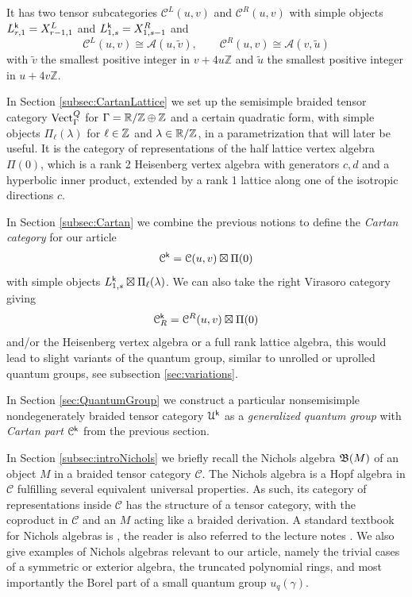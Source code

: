 \documentclass[a4paper, reqno]{amsart}
\theoremstyle{introTheorems}
\def\ZZ{\mathbb{Z}}
\newcommand\cA{\mathcal{A}}
\newcommand\cC{\mathcal{C}}
\newcommand\cU{\mathcal{U}}
\newcommand{\Vect}{\textup{Vect}}
\newcommand\g\gamma
\renewcommand{\1}{\mathbbold{1}}
\begin{document}
It has two tensor subcategories $\cC^L(u,v)$ and $\cC^R(u,v)$ with simple objects $L^{\mathsf{k}}_{r,1}=X^L_{r-1,1}$ and $L^{\mathsf{k}}_{1,s}=X^R_{1,s-1}$ and %
\[
\cC^L(u, v) \cong \cA(u, \tilde v), \qquad \cC^R(u, v) \cong \cA(v, \tilde u)
\]
with $\tilde v$ the smallest positive integer in $v + 4u \ZZ$ and $\tilde u $ the smallest positive integer in $u + 4v \ZZ$. 

In Section \ref{subsec:CartanLattice} we set up the semisimple braided tensor category $\Vect_{\Gamma}^Q$ for $\Gamma=\mathbb{R}/\mathbb{Z}\oplus \mathbb{Z}$ and a certain quadratic form, with simple objects $\Pi_\ell(\lambda)$ for $\ell\in\mathbb{Z}$ and $\lambda\in \mathbb{R}/\mathbb{Z}$, in a parametrization that will later be useful. It is the category of representations of the half lattice vertex algebra $\Pi(0)$, which is a rank 2 Heisenberg vertex algebra with generators $c,d$ and a hyperbolic inner product, extended by a rank 1 lattice along one of the isotropic directions $c$.

In Section \ref{subsec:Cartan} we combine the previous notions to define the \emph{Cartan category} for our article
\[\cC^\k = \cC(u,v)\boxtimes \Pi(0)\] with simple objects $L^{\mathsf{k}}_{1,s}\boxtimes\Pi_\ell(\lambda)$. We can also take the right Virasoro category giving
\[\cC^\k_R = \cC^R(u,v)\boxtimes \Pi(0)\]
and/or the Heisenberg vertex algebra or a full rank lattice algebra, this would lead  to slight variants of the quantum group, similar to unrolled or uprolled quantum groups, see subsection \ref{sec:variations}.


\bigskip

In Section \ref{sec:QuantumGroup} we construct a particular nonsemisimple nondegenerately braided tensor category $\cU^\k$ as a \emph{generalized quantum group} with \emph{Cartan part} $\cC^\k$ from the previous section.

In Section \ref{subsec:introNichols} we briefly recall the Nichols algebra $\mathfrak{B}(M)$ of an object $M$ in a braided tensor category $\cC$. The Nichols algebra  is a Hopf algebra in $\cC$ fulfilling several equivalent universal properties. As such, its category of representations inside $\cC$ has the structure of a tensor category, with the coproduct in $\cC$ and an $M$ acting like a braided derivation. A standard textbook for Nichols algebras is \cite{HS20}, the reader is also referred to the lecture notes \cite{Len26}. We also give examples of Nichols algebras relevant to our article, namely the trivial cases of a symmetric or exterior algebra, the truncated polynomial rings, and most importantly the Borel part of a small quantum group $u_q(\g)$.
\end{document}
